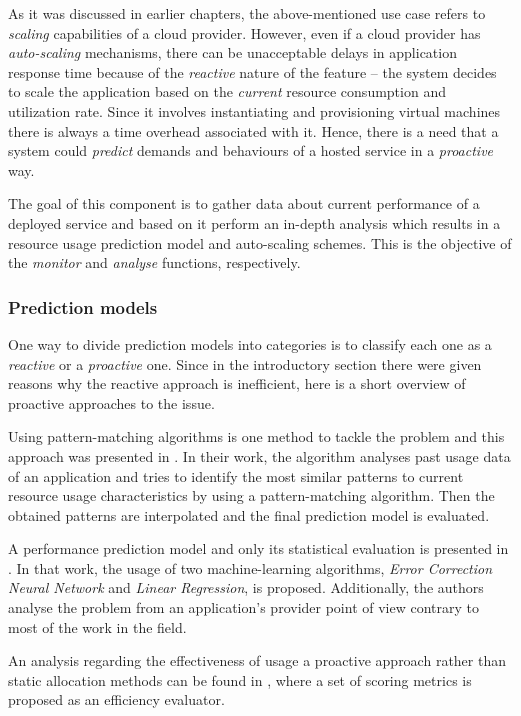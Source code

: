 As it was discussed in earlier chapters, the above-mentioned use case refers to \emph{scaling} capabilities of a cloud provider. However, even if a cloud provider has \emph{auto-scaling} mechanisms, there can be unacceptable delays in application response time because of the \emph{reactive} nature of the feature -- the system decides to scale the application based on the \emph{current} resource consumption and utilization rate. Since it involves instantiating and provisioning virtual machines there is always a time overhead associated with it. Hence, there is a need that a system could \emph{predict} demands and behaviours of a hosted service in a \emph{proactive} way. 

The goal of this component is to gather data about current performance of a deployed service and based on it perform an in-depth analysis which results in a resource usage prediction model and auto-scaling schemes. This is the objective of the \emph{monitor} and \emph{analyse} functions, respectively.

\subsubsection*{Prediction models}
One way to divide prediction models into categories is to classify each one as a \emph{reactive} or a \emph{proactive} one. Since in the introductory section there were given reasons why the reactive approach is inefficient, here is a short overview of proactive approaches to the issue.

Using pattern-matching algorithms is one method to tackle the problem and this approach was presented in \cite{caron2010forecasting}. In their work, the algorithm analyses past usage data of an application and tries to identify the most similar patterns to current resource usage characteristics by using a pattern-matching algorithm. Then the obtained patterns are interpolated and the final prediction model is evaluated.

A performance prediction model and only its statistical evaluation is presented in \cite{islam2012empirical}. In that work, the usage of two machine-learning algorithms, \emph{Error Correction Neural Network} and \emph{Linear Regression}, is proposed. Additionally, the authors analyse the problem from an application's provider point of view contrary to most of the work in the field.

An analysis regarding the effectiveness of usage a proactive approach rather than static allocation methods can be found in \cite{kupferman2009scaling}, where a set of scoring metrics is proposed as an efficiency evaluator.

